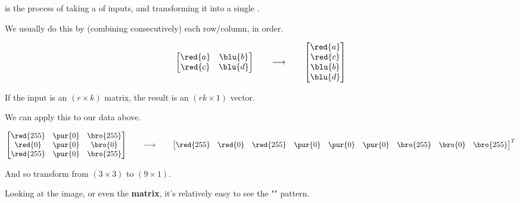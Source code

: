         \begin{definition}
             is the process of taking a  of inputs, and transforming it into a single .

            We usually do this by  (combining consecutively) each row/column, in order.

            \begin{equation*}
                \begin{bmatrix}
                    \red{a} & \blu{b} \\ \red{c} & \blu{d}
                \end{bmatrix}
                \qquad \longrightarrow \qquad
                \begin{bmatrix}
                    \red{a} \\ \red{c} \\ \blu{b} \\ \blu{d}
                \end{bmatrix}
            \end{equation*}

            If the input is an $(r \times k)$ matrix, the result is an $(rk \times 1)$ vector.
        \end{definition}

        \miniex We can apply this to our data above.

        \begin{equation}
            \begin{bmatrix}
                \red{255} & \pur{0} & \bro{255} \\
                \red{0} & \pur{0} & \bro{0} \\
                \red{255} & \pur{0} & \bro{255}
            \end{bmatrix}
            \qquad \longrightarrow \qquad 
            \begin{bmatrix}
                \red{255} & \red{0} & \red{255} & 
                \pur{0} & \pur{0} & \pur{0} & 
                \bro{255} & \bro{0} & \bro{255}
            \end{bmatrix}^T
        \end{equation}


        And so transform from $(3 \times 3)$ to $(9 \times 1)$.

        Looking at the image, or even the \textbf{matrix}, it's relatively easy to see the "" pattern. 

